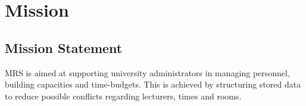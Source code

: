 \chapter{Mission}
\section{Mission Statement}
MRS is aimed at supporting university administrators in managing personnel, building capacities and time-budgets.
This is achieved by structuring stored data to reduce possible conflicts regarding lecturers, times and rooms.
